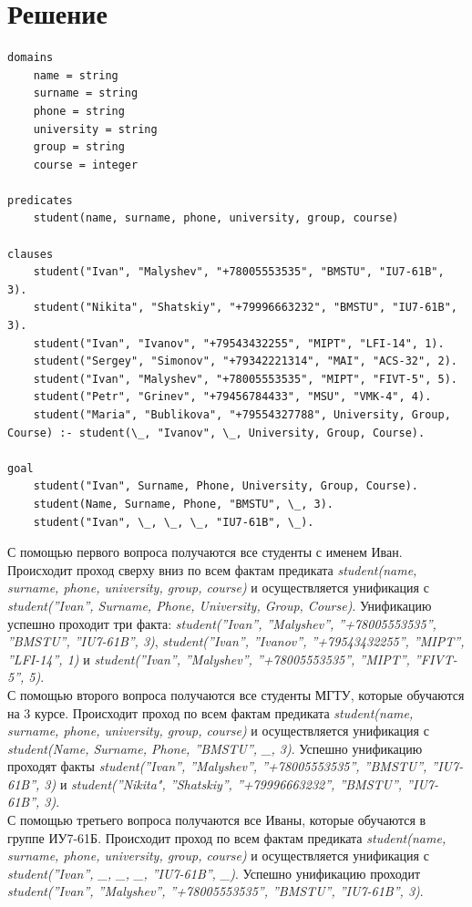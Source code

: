 \documentclass[12pt]{report}
\begin{document}
\section*{Решение}
\begin{lstlisting}
domains
	name = string
	surname = string
	phone = string
	university = string
	group = string
	course = integer

predicates
	student(name, surname, phone, university, group, course)

clauses
	student("Ivan", "Malyshev", "+78005553535", "BMSTU", "IU7-61B", 3).
	student("Nikita", "Shatskiy", "+79996663232", "BMSTU", "IU7-61B", 3).
	student("Ivan", "Ivanov", "+79543432255", "MIPT", "LFI-14", 1).
	student("Sergey", "Simonov", "+79342221314", "MAI", "ACS-32", 2).
	student("Ivan", "Malyshev", "+78005553535", "MIPT", "FIVT-5", 5).
	student("Petr", "Grinev", "+79456784433", "MSU", "VMK-4", 4).
	student("Maria", "Bublikova", "+79554327788", University, Group, Course) :- student(\_, "Ivanov", \_, University, Group, Course).

goal
	student("Ivan", Surname, Phone, University, Group, Course).
	student(Name, Surname, Phone, "BMSTU", \_, 3).
	student("Ivan", \_, \_, \_, "IU7-61B", \_).
\end{lstlisting}

С помощью первого вопроса получаются все студенты с именем Иван. Происходит проход сверху вниз по всем фактам предиката \emph{student(name, surname, phone, university, group, course)} и осуществляется унификация с \emph{student(''Ivan'', Surname, Phone, University, Group, Course)}. Унификацию успешно проходит три факта: \emph{student(''Ivan'', ''Malyshev'', ''+78005553535'', ''BMSTU'', ''IU7-61B'', 3)}, \emph{student(''Ivan'', ''Ivanov'', ''+79543432255'', ''MIPT'', ''LFI-14'', 1)} и \emph{student(''Ivan'', ''Malyshev'', ''+78005553535'', ''MIPT'', ''FIVT-5'', 5)}.\\

С помощью второго вопроса получаются все студенты МГТУ, которые обучаются на 3 курсе.  Происходит проход по всем фактам предиката \emph{student(name, surname, phone, university, group, course)} и осуществляется унификация с \emph{student(Name, Surname, Phone, ''BMSTU'', \_, 3)}.  Успешно унификацию проходят факты \emph{student(''Ivan'', ''Malyshev'', ''+78005553535'', ''BMSTU'', ''IU7-61B'', 3)} и \emph{student(''Nikita", ''Shatskiy'', ''+79996663232'', ''BMSTU'', ''IU7-61B'', 3)}.\\

С помощью третьего вопроса получаются все Иваны, которые обучаются в группе ИУ7-61Б.  Происходит проход по всем фактам предиката \emph{student(name, surname, phone, university, group, course)} и осуществляется унификация с \emph{student(''Ivan'', \_, \_, \_, ''IU7-61B'', \_)}.  Успешно унификацию проходит \emph{student(''Ivan'', ''Malyshev'', ''+78005553535'', ''BMSTU'', ''IU7-61B'', 3)}.\\
\end{document}
